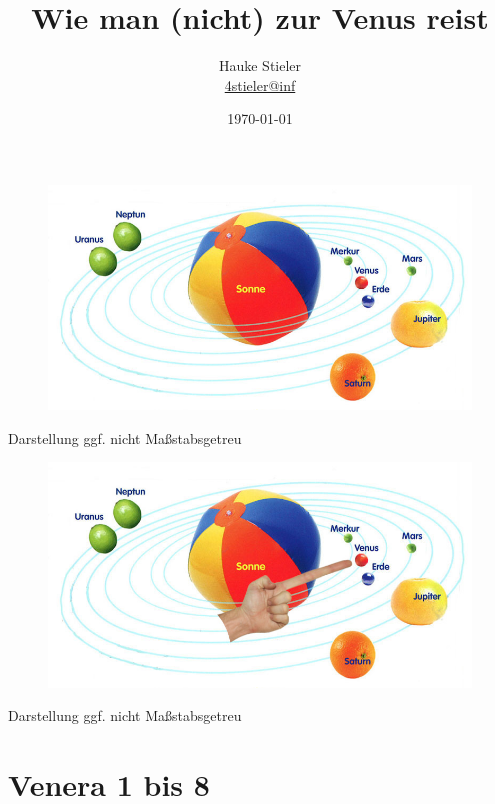 \documentclass{beamer}
\author[Hauke Stieler]{Hauke Stieler\\\href{mailto:4stieler@informatik.uni-hamburg.de}{4stieler@inf}}
\title{Wie man (nicht) zur Venus reist}
\date{\today}
\begin{document}
	\maketitle\newpage
	\tableofcontents[hidesubsections]\newpage
	\begin{frame}
		\begin{figure}[ht]
			\includegraphics[scale=0.4]{./images/sonnensystem}
		\end{figure}
		{\tiny * Darstellung ggf. nicht Maßstabsgetreu}
	\end{frame}
	\begin{frame}
		\begin{figure}[ht]
			\includegraphics[scale=0.4]{./images/sonnensystem2finger}
		\end{figure}
		{\tiny * Darstellung ggf. nicht Maßstabsgetreu}
	\end{frame}
	\section{Venera 1 bis 8}
\end{document}
